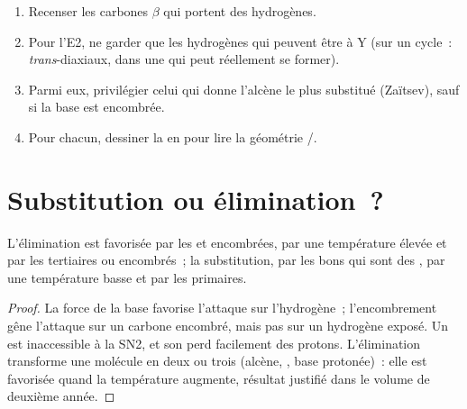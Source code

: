 \begin{method}\label{met:b1:elimination:predict-alkene}
\begin{enumerate}
  \item Recenser les carbones $\beta$ qui portent des hydrogènes.
  \item Pour l'E2, ne garder que les hydrogènes qui peuvent être
         à Y (sur un cycle~: \textit{trans}-diaxiaux,
        dans une  qui peut réellement se former).
  \item Parmi eux, privilégier celui qui donne l'alcène le plus
        substitué (Zaïtsev), sauf si la base est encombrée.
  \item Pour chacun, dessiner la  en  pour lire la géométrie /.
\end{enumerate}
\end{method}

\section{Substitution ou élimination~?}

\begin{proposition}\label{prop:b1:elimination:sn-vs-e}
L'élimination est favorisée par les  et encombrées, par une
température élevée et par les  tertiaires ou encombrés~; la
substitution, par les bons  qui sont des , par
une température basse et par les  primaires.
\end{proposition}

\begin{proof}
La force de la base favorise l'attaque sur l'hydrogène~; l'encombrement
gêne l'attaque sur un carbone encombré, mais pas sur un hydrogène
exposé. Un  est inaccessible à la SN2, et son
 perd facilement des protons. L'élimination transforme une
molécule en deux ou trois (alcène, , base protonée)~: elle
est favorisée quand la température augmente, résultat justifié dans le
volume de deuxième année.
\end{proof}

